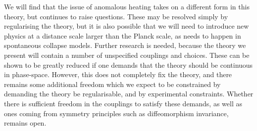 \documentclass[aps,pra,showpacs,citeautoscript,amsmath,amssymb,floatfix,superscriptaddress,bbm, verbatim,amsfonts,changes,10pt,nofootinbib,longbibliography]{revtex4-1}
\begin{document}
We will find that the issue of anomalous heating takes on a different form in this theory,
	but continues to raise questions. These may be resolved simply by regularising the theory, but it is also possible that we will need to introduce new physics at a distance scale larger than the Planck scale, as needs to happen in spontaneous collapse models\cite{ballentine1991failure,gallis1991comparison,shimony1990desiderata,donadi2021underground}. %
	Further  research is needed, because the theory we present will contain a number of unspecified couplings and choices. These can be shown to be greatly reduced if one demands that the theory should be continuous in phase-space\cite{UCLPawula}. However, this does not completely fix the theory, and there remains some additional freedom which we expect to be constrained by demanding the theory be regularisable, and by experimental constraints. Whether there is sufficient freedom in the couplings to satisfy these demands, as well as ones coming from symmetry principles such as diffeomorphism invariance, remains open.
	
\end{document}

